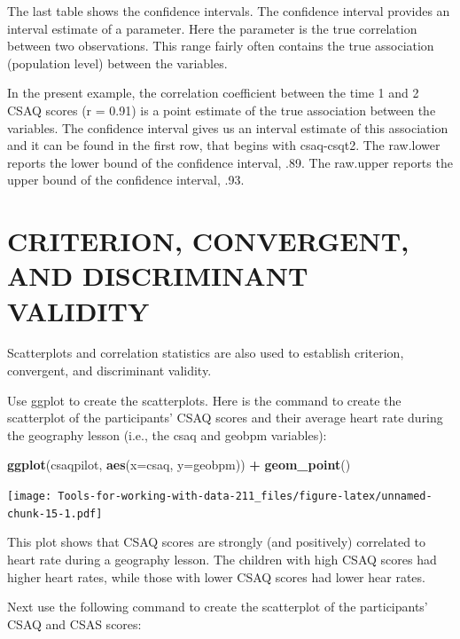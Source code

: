 \documentclass[
]{book}
\newenvironment{Shaded}{\begin{snugshade}}{\end{snugshade}}
\newcommand{\DataTypeTok}[1]{\textcolor[rgb]{0.13,0.29,0.53}{#1}}
\newcommand{\KeywordTok}[1]{\textcolor[rgb]{0.13,0.29,0.53}{\textbf{#1}}}
\newcommand{\NormalTok}[1]{#1}
\newcommand{\OperatorTok}[1]{\textcolor[rgb]{0.81,0.36,0.00}{\textbf{#1}}}
\newcommand{\StringTok}[1]{\textcolor[rgb]{0.31,0.60,0.02}{#1}}
\begin{document}
The last table shows the confidence intervals. The confidence interval provides an interval estimate of a parameter. Here the parameter is the true correlation between two observations. This range fairly often contains the true association (population level) between the variables.

In the present example, the correlation coefficient between the time 1 and 2 CSAQ scores (r = 0.91) is a point estimate of the true association between the variables. The confidence interval gives us an interval estimate of this association and it can be found in the first row, that begins with csaq-csqt2. The raw.lower reports the lower bound of the confidence interval, .89. The raw.upper reports the upper bound of the confidence interval, .93.

\hypertarget{criterion-convergent-and-discriminant-validity}{%
\section{CRITERION, CONVERGENT, AND DISCRIMINANT VALIDITY}\label{criterion-convergent-and-discriminant-validity}}

Scatterplots and correlation statistics are also used to establish criterion, convergent, and discriminant validity.

Use ggplot to create the scatterplots. Here is the command to create the scatterplot of the participants' CSAQ scores and their average heart rate during the geography lesson (i.e., the csaq and geobpm variables):

\begin{Shaded}
\begin{Highlighting}[]
\KeywordTok{ggplot}\NormalTok{(csaqpilot, }\KeywordTok{aes}\NormalTok{(}\DataTypeTok{x=}\NormalTok{csaq, }\DataTypeTok{y=}\NormalTok{geobpm)) }\OperatorTok{+}
\StringTok{  }\KeywordTok{geom_point}\NormalTok{()}
\end{Highlighting}
\end{Shaded}

\texttt{[image: Tools-for-working-with-data-211\_files/figure-latex/unnamed-chunk-15-1.pdf]}

This plot shows that CSAQ scores are strongly (and positively) correlated to heart rate during a geography lesson. The children with high CSAQ scores had higher heart rates, while those with lower CSAQ scores had lower hear rates.

Next use the following command to create the scatterplot of the participants' CSAQ and CSAS scores:
\end{document}
